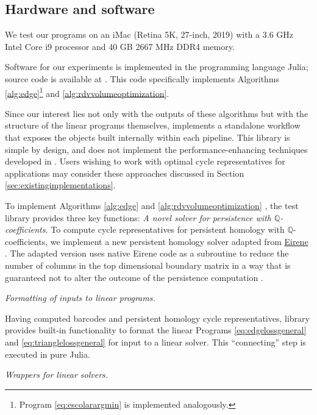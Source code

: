 \documentclass[utf8]{formatting_stuff/frontiersFPHY}
\newcommand{\Q}{\mathbb{Q}}
\newcommand{\se}{Section }
\newcommand{\pr}{Program }
\theoremstyle{plain}
\theoremstyle{definition}
\providecommand{\DIFaddtex}[1]{{\protect\color{blue}\uwave{#1}}}
\providecommand{\DIFaddbegin}{} %
\providecommand{\DIFaddend}{} %
\providecommand{\DIFadd}[1]{\texorpdfstring{\DIFaddtex{#1}}{#1}} %
\begin{document}
\subsection{Hardware and software}
\label{subsec:hardwaresoftware}

We test our programs on an iMac (Retina 5K, 27-inch, 2019) with a 3.6 GHz Intel Core i9 processor and 40 GB 2667 MHz DDR4 memory.


Software for our experiments is implemented in the programming language Julia; source code is available at \cite{li_thompson}.  This code specifically implements Algorithms \ref{alg:edge}\footnote{ \pr \eqref{eq:escolarargmin} is implemented analogously.} and \ref{alg:rdvvolumeoptimization}.


Since our interest lies not only with the outputs of these algorithms but with the structure of the linear programs themselves, \cite{li_thompson} implements a standalone workflow that exposes the objects built internally within each pipeline.  This library is simple by design, and does not implement the performance-enhancing techniques  developed in \cite{Escolar2016, Obayashi2018}. Users wishing to work with optimal cycle representatives for applications may consider these approaches 
discussed in \se \ref{sec:existingimplementations}.


To implement  Algorithms \ref{alg:edge} and \ref{alg:rdvvolumeoptimization} \DIFaddbegin \DIFadd{in homological dimension one}\DIFaddend , the test library \cite{li_thompson} provides three key functions:  
\emph{A novel solver for persistence with $\Q$-coefficients.} To compute cycle representatives for persistent homology with $\Q$-coefficients, we implement a new persistent homology solver adapted from  \url{Eirene}  \cite{eirenecode}.  The adapted version uses native Eirene code as a subroutine to reduce the number of columns in the top dimensional boundary matrix in a way that is guaranteed not to alter the outcome of the persistence computation \cite{eirene}.

\DIFaddbegin \noindent\DIFaddend \emph{Formatting of inputs to linear programs.} 
\DIFaddbegin 

\DIFaddend Having computed barcodes and persistent homology cycle representatives, library \cite{li_thompson}  provides built-in functionality to format the linear Programs \eqref{eq:edgelossgeneral} and \eqref{eq:trianglelossgeneral} for input to a linear solver.  This ``connecting'' step is executed in pure Julia. 


\DIFaddbegin \noindent \DIFaddend \emph{Wrappers for linear solvers.} \label{linear solvers} 
\end{document}
